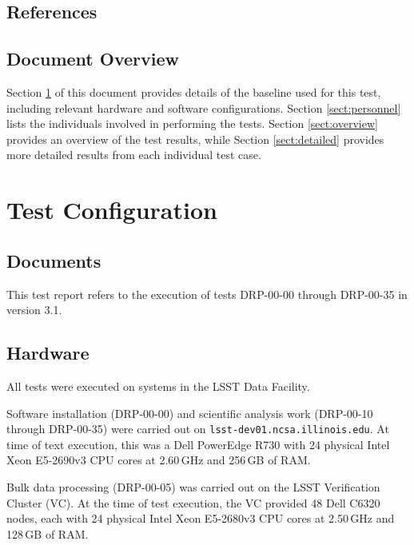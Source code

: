 \documentclass[DM,lsstdraft,STR,toc]{lsstdoc}
\begin{document}
\subsection{References}
\label{sect:references}

\renewcommand{\refname}{}


\subsection{Document Overview}
\label{sect:docoverview}

Section \ref{sect:configuration} of this document provides details of the \product{} baseline used for this test, including relevant hardware and software configurations.
Section \ref{sect:personnel} lists the individuals involved in performing the tests.
Section \ref{sect:overview} provides an overview of the test results, while Section \ref{sect:detailed} provides more detailed results from each individual test case.

\section{Test Configuration}
\label{sect:configuration}

\subsection{Documents}

This test report refers to the execution of tests DRP-00-00 through DRP-00-35 in  version 3.1.

\subsection{Hardware}
\label{sect:hwconf}

All tests were executed on systems in the LSST Data Facility.

Software installation (DRP-00-00) and scientific analysis work (DRP-00-10 through DRP-00-35) were carried out on \texttt{lsst-dev01.ncsa.illinois.edu}.
At time of text execution, this was a Dell PowerEdge R730 with 24 physical Intel Xeon E5-2690v3 CPU cores at 2.60\,GHz and 256\,GB of RAM.

Bulk data processing (DRP-00-05) was carried out on the LSST Verification Cluster (VC).
At the time of test execution, the VC provided 48 Dell C6320 nodes, each with 24 physical Intel Xeon E5-2680v3 CPU cores at 2.50\,GHz and 128\,GB of RAM.
\end{document}
